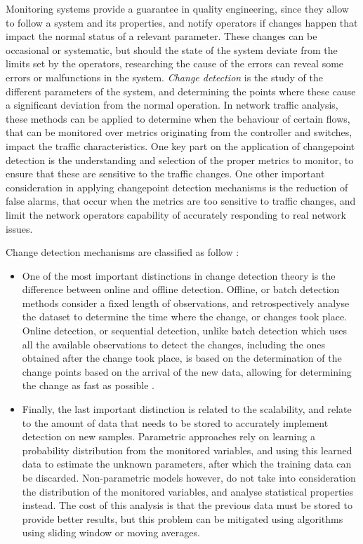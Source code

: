 \par Monitoring systems provide a guarantee in quality engineering, since they allow to follow a system and its properties, and notify operators if changes happen
that impact the normal status of a relevant parameter. These changes can be occasional or systematic, but should the state of the system deviate from the limits set
by the operators, researching the cause of the errors can reveal some errors or malfunctions in the system. \textit{Change detection} is the study of the different 
parameters of the system, and determining the points where these cause a significant deviation from the normal operation. In network traffic analysis, these methods
can be applied to determine when the behaviour of certain flows, that can be monitored over metrics originating from the controller and switches, impact the traffic
characteristics. One key part on the application of changepoint detection is the understanding and selection of the proper metrics to monitor, to ensure that these
are sensitive to the traffic changes. One other important consideration in applying changepoint detection mechanisms is the reduction of false alarms, that occur 
when the metrics are too sensitive to traffic changes, and limit the network operators capability of accurately responding to real network issues. 

\par Change detection mechanisms are classified as follow  \cite{munz_traffic_2010}:

\begin {itemize}
    \item One of the most important distinctions in change detection theory is the difference between online and offline detection. Offline, or batch detection 
        methods consider a fixed length of observations, and retrospectively analyse the dataset to determine the time where the change, or changes took place. 
        Online detection, or sequential detection, unlike batch detection which uses all the available observations to detect the changes, including the
        ones obtained after the change took place, is based on the determination of the change points based on the arrival of the new data, allowing for determining
        the change as fast as possible \cite{ahmed_novel_2008}. 
    \item Finally, the last important distinction is related to the scalability, and relate to the amount of data that needs to be stored to accurately implement
        detection on new samples. Parametric approaches rely on learning a probability distribution from the monitored variables, and using this learned data to 
        estimate the unknown parameters, after which the training data can be discarded. Non-parametric models however, do not take into consideration the
        distribution of the monitored variables, and analyse statistical properties instead. The cost of this analysis is that the previous data must be stored to
        provide better results, but this problem can be mitigated using algorithms using sliding window or moving averages.
\end {itemize}


